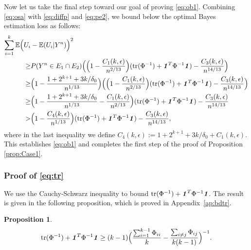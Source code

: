 \documentclass[11pt,onecolumn]{IEEEtran}
\newtheorem{proposition}[theorem]{Proposition}
\def\mathbi#1{{\textbf{\textit #1}}}
\DeclareMathOperator{\tr}{tr}
\begin{document}
Now let us take the final step toward our goal of proving \eqref{eq:ob1}.
Combining \eqref{eq:osa} with \eqref{eq:diffp} and \eqref{eq:pe2}, we bound below the optimal Bayes estimation loss 
as follows:
\begin{align}
 \sum_{i=1}^k \mathbb{E}  \Big(U_i&- \mathbb{E} (U_i | Y^n ) \Big)^2   \nonumber\\
\ge & P(Y^n \in E_1\cap E_2 ) 
\Big( \Big(1 - \frac{C_1(k,\epsilon)}{n^{2/13} } \Big) 
( \tr(\Phi^{-1}) + \mathbi{1}^T \Phi^{-1} \mathbi{1} ) 
  -  \frac{C_3(k,\epsilon)}{n^{14/13}}  \Big) \nonumber\\
\ge & \Big(1 - \frac{1 + 2^{k+1} + 3k/\delta_0}{n^{1/13}} \Big)
\Big( \Big(1 - \frac{C_1(k,\epsilon)}{n^{2/13} } \Big) 
( \tr(\Phi^{-1}) + \mathbi{1}^T \Phi^{-1} \mathbi{1} ) 
  -  \frac{C_3(k,\epsilon)}{n^{14/13}}  \Big) \nonumber\\
\ge & \Big(1  - \frac{1 + 2^{k+1} + 3k/\delta_0}{n^{1/13}}
 - \frac{C_1(k,\epsilon)}{n^{2/13} } \Big) ( \tr(\Phi^{-1}) + \mathbi{1}^T \Phi^{-1} \mathbi{1} ) 
 -  \frac{C_3(k,\epsilon)}{n^{14/13}}  \nonumber\\
> & \Big(1  - \frac{C_4(k,\epsilon)}{n^{1/13}} \Big)
 ( \tr(\Phi^{-1}) + \mathbi{1}^T \Phi^{-1} \mathbi{1} ) 
 -  \frac{C_3(k,\epsilon)}{n^{14/13}}, \nonumber
\end{align}
where in the last inequality we define 
$C_4(k,\epsilon) := 1 + 2^{k+1} + 3k/\delta_0 + C_1(k,\epsilon)$.
This establishes \eqref{eq:ob1} and completes the first step of the proof of Proposition \ref{prop:Case1}.

\vspace*{.1in}
\subsubsection{Proof of \eqref{eq:tr}}

We use the Cauchy-Schwarz inequality to bound $\tr(\Phi^{-1}) + \mathbi{1}^T \Phi^{-1} \mathbi{1}$. The result
is given in the following proposition, which is proved in Appendix~\ref{ap:bdtr}.
\begin{proposition}\label{Prop:bdtr}
\begin{equation}\label{eq:itp}
\tr(\Phi^{-1}) + \mathbi{1}^T \Phi^{-1} \mathbi{1}
\ge (k-1)
\Big( \frac{\sum_{i=1}^{k-1}\Phi_{ii}}{k}-\frac{\sum_{i\neq j}\Phi_{ij} }{k(k-1)} \Big)^{-1}.
\end{equation}
\end{proposition}
\end{document}
